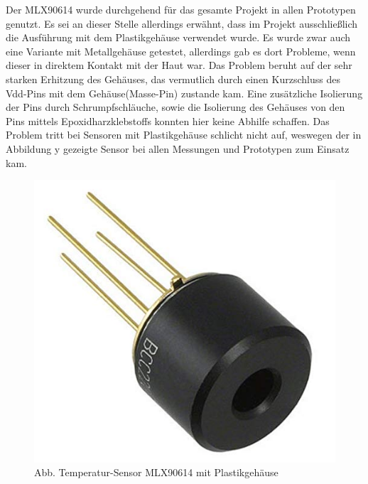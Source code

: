 Der MLX90614 wurde durchgehend für das gesamte Projekt in allen Prototypen genutzt. Es sei an dieser Stelle allerdings erwähnt, dass im Projekt ausschließlich die Ausführung mit dem Plastikgehäuse verwendet wurde. Es wurde zwar auch eine Variante mit Metallgehäuse getestet, allerdings gab es dort Probleme, wenn dieser in direktem Kontakt mit der Haut war. Das Problem beruht auf der sehr starken Erhitzung des Gehäuses, das vermutlich durch einen Kurzschluss des Vdd-Pins mit dem Gehäuse(Masse-Pin) zustande kam. Eine zusätzliche Isolierung der Pins durch Schrumpfschläuche, sowie die Isolierung des Gehäuses von den Pins mittels Epoxidharzklebstoffs konnten hier keine Abhilfe schaffen. Das Problem tritt bei Sensoren mit Plastikgehäuse schlicht nicht auf, weswegen der in Abbildung y gezeigte Sensor bei allen Messungen und Prototypen zum Einsatz kam.

\begin{figure}[H] \centering
\includegraphics[width=\textwidth]{Images/Temp_Case.png} 
\vspace{-0.3cm} 
\caption{Abb. Temperatur-Sensor MLX90614 mit Plastikgehäuse}
\label{fig-elise} 
\end{figure}




